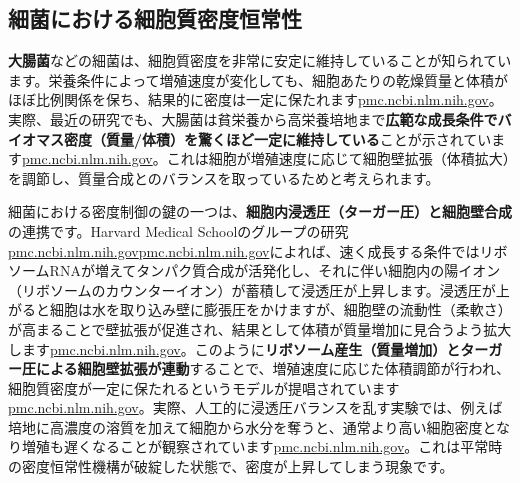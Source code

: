 \subsection{細菌における細胞質密度恒常性}

\textbf{大腸菌}などの細菌は、細胞質密度を非常に安定に維持していることが知られています。栄養条件によって増殖速度が変化しても、細胞あたりの乾燥質量と体積がほぼ比例関係を保ち、結果的に密度は一定に保たれます\href{https://pmc.ncbi.nlm.nih.gov/articles/PMC11065075/\#:~:text=these\%20processes\%20are\%20indeed\%20coupled4,picture\%20that\%20emerges\%20is\%20that}{pmc.ncbi.nlm.nih.gov}。実際、最近の研究でも、大腸菌は貧栄養から高栄養培地まで\textbf{広範な成長条件でバイオマス密度（質量/体積）を驚くほど一定に維持している}ことが示されています\href{https://pmc.ncbi.nlm.nih.gov/articles/PMC11065075/\#:~:text=remarkably\%20constant\%20across\%20a\%20large,higher\%20biomass\%20density\%20and\%20slower}{pmc.ncbi.nlm.nih.gov}。これは細胞が増殖速度に応じて細胞壁拡張（体積拡大）を調節し、質量合成とのバランスを取っているためと考えられます。

細菌における密度制御の鍵の一つは、\textbf{細胞内浸透圧（ターガー圧）\textbf{と}細胞壁合成}の連携です。Harvard Medical Schoolのグループの研究\href{https://pmc.ncbi.nlm.nih.gov/articles/PMC11065075/\#:~:text=these\%20processes\%20are\%20indeed\%20coupled4,picture\%20that\%20emerges\%20is\%20that}{pmc.ncbi.nlm.nih.gov}\href{https://pmc.ncbi.nlm.nih.gov/articles/PMC11065075/\#:~:text=these\%20apparently\%20confounding\%20observations\%20but,mechanism\%20of\%20action\%20of\%20antibiotics6}{pmc.ncbi.nlm.nih.gov}によれば、速く成長する条件ではリボソームRNAが増えてタンパク質合成が活発化し、それに伴い細胞内の陽イオン（リボソームのカウンターイオン）が蓄積して浸透圧が上昇します。浸透圧が上がると細胞は水を取り込み壁に膨張圧をかけますが、細胞壁の流動性（柔軟さ）が高まることで壁拡張が促進され、結果として体積が質量増加に見合うよう拡大します\href{https://pmc.ncbi.nlm.nih.gov/articles/PMC11065075/\#:~:text=these\%20apparently\%20confounding\%20observations\%20but,mechanism\%20of\%20action\%20of\%20antibiotics6}{pmc.ncbi.nlm.nih.gov}。このように\textbf{リボソーム産生（質量増加）とターガー圧による細胞壁拡張が連動}することで、増殖速度に応じた体積調節が行われ、細胞質密度が一定に保たれるというモデルが提唱されています\href{https://pmc.ncbi.nlm.nih.gov/articles/PMC11065075/\#:~:text=these\%20apparently\%20confounding\%20observations\%20but,mechanism\%20of\%20action\%20of\%20antibiotics6}{pmc.ncbi.nlm.nih.gov}。実際、人工的に浸透圧バランスを乱す実験では、例えば培地に高濃度の溶質を加えて細胞から水分を奪うと、通常より高い細胞密度となり増殖も遅くなることが観察されています\href{https://pmc.ncbi.nlm.nih.gov/articles/PMC11065075/\#:~:text=remarkably\%20constant\%20across\%20a\%20large,higher\%20biomass\%20density\%20and\%20slower}{pmc.ncbi.nlm.nih.gov}。これは平常時の密度恒常性機構が破綻した状態で、密度が上昇してしまう現象です。

